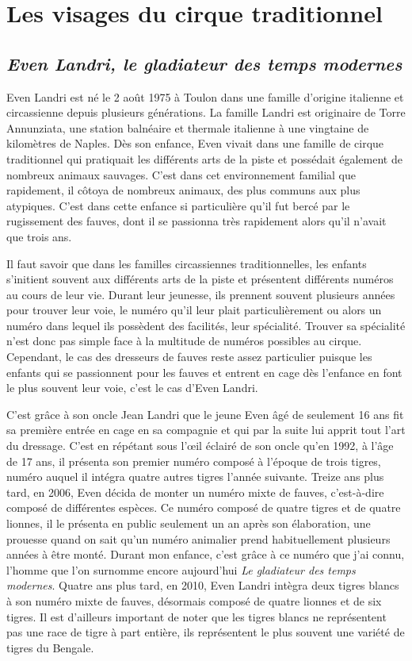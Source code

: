 \chapter{Les visages du cirque traditionnel}
\section*{\textit{Even Landri, le gladiateur des temps modernes}}
{}

Even Landri est né le 2 août 1975 à Toulon dans une famille d'origine italienne et circassienne depuis plusieurs générations. La famille Landri est originaire de Torre Annunziata, une station balnéaire et thermale italienne à une vingtaine de kilomètres de Naples. Dès son enfance, Even vivait dans une famille de cirque traditionnel qui pratiquait les différents arts de la piste et possédait également de nombreux animaux sauvages. C'est dans cet environnement familial que rapidement, il côtoya de nombreux animaux, des plus communs aux plus atypiques. C'est dans cette enfance si particulière qu'il fut bercé par le rugissement des fauves, dont il se passionna très rapidement alors qu'il n'avait que trois ans.

Il faut savoir que dans les familles circassiennes traditionnelles, les enfants s'initient souvent aux différents arts de la piste et présentent différents numéros au cours de leur vie. Durant leur jeunesse, ils prennent souvent plusieurs années pour trouver leur voie, le numéro qu'il leur plait particulièrement ou alors un numéro dans lequel ils possèdent des facilités, leur spécialité. Trouver sa spécialité n'est donc pas simple face à la multitude de numéros possibles au cirque. Cependant, le cas des dresseurs de fauves reste assez particulier puisque les enfants qui se passionnent pour les fauves et entrent en cage dès l'enfance en font le plus souvent leur voie, c'est le cas d'Even Landri. 

C'est grâce à son oncle Jean Landri que le jeune Even âgé de seulement 16 ans fit sa première entrée en cage en sa compagnie et qui par la suite lui apprit tout l'art du dressage. C'est en répétant sous l'œil éclairé de son oncle qu’en 1992, à l'âge de 17 ans, il présenta son premier numéro composé à l'époque de trois tigres, numéro auquel il intégra quatre autres tigres l'année suivante. Treize ans plus tard, en 2006, Even décida de monter un numéro mixte de fauves, c’est-à-dire composé de différentes espèces. Ce numéro composé de quatre tigres et de quatre lionnes, il le présenta en public seulement un an après son élaboration, une prouesse quand on sait qu'un numéro animalier prend habituellement plusieurs années à être monté. Durant mon enfance, c'est grâce à ce numéro que j'ai connu, l'homme que l'on surnomme encore aujourd'hui \textit{Le gladiateur des temps modernes}. Quatre ans plus tard, en 2010, Even Landri intègra deux tigres blancs à son numéro mixte de fauves, désormais composé de quatre lionnes et de six tigres. Il est d'ailleurs important de noter que les tigres blancs ne représentent pas une race de tigre à part entière, ils représentent le plus souvent une variété de tigres du Bengale. 

